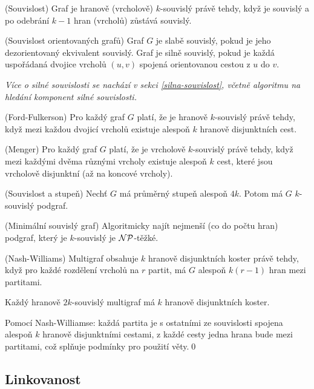 \df (Souvislost) Graf je hranově (vrcholově) $k$-souvislý právě tehdy, když je
souvislý a po odebrání $k-1$ hran (vrcholů) zůstává souvislý.

\df (Souvislost orientovaných grafů) Graf $G$ je slabě souvislý, pokud je jeho
dezorientovaný ekvivalent souvislý. Graf je silně souvislý, pokud je každá uspořádaná dvojice vrcholů $(u,v)$ spojená orientovanou cestou z $u$ do $v$.

{\it Více o silné souvislosti se nachází v sekci \ref{silna-souvislost}, včetně
algoritmu na hledání komponent silné souvislosti.}

\vt (Ford-Fulkerson) Pro každý graf $G$ platí, že je hranově $k$-souvislý právě
tehdy, když mezi každou dvojicí vrcholů existuje alespoň $k$ hranově
disjunktních cest.

\vt (Menger) Pro každý graf $G$ platí, že je vrcholově $k$-souvislý právě
tehdy, když mezi každými dvěma různými vrcholy existuje alespoň $k$ cest, které
jsou vrcholově disjunktní (až na koncové vrcholy).

\vt (Souvislost a stupeň) Nechť $G$ má průměrný stupeň alespoň $4k$. Potom má
$G$ $k$-souvislý podgraf.

\vt (Minimální souvislý graf) Algoritmicky najít nejmenší (co do počtu hran)
podgraf, který je $k$-souvislý je $\mathcal{NP}$-těžké.

%
%

\vt (Nash-Williams) Multigraf obsahuje $k$ hranově disjunktních koster právě
tehdy, když pro každé rozdělení vrcholů na $r$ partit, má $G$ alespoň $k(r-1)$
hran mezi partitami.

\vt Každý hranově $2k$-souvislý multigraf má $k$ hranově disjunktních koster.

\dk Pomocí Nash-Williamse: každá partita je s ostatními ze souvislosti spojena
alespoň $k$ hranově disjunktními cestami, z každé cesty jedna hrana bude mezi
partitami, což splňuje podmínky pro použití věty.\qed

\subsection{Linkovanost}

